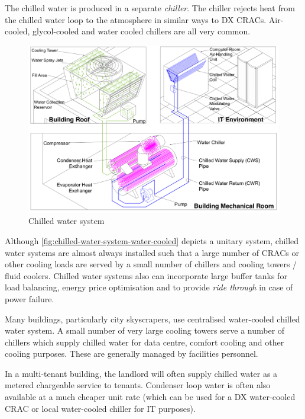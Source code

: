 \documentclass{pgnotes}
\begin{document}

The chilled water is produced in a separate \textit{chiller}.
The chiller rejects heat from the chilled water loop to the atmosphere in similar ways to DX CRACs.
Air-cooled, glycol-cooled and water cooled chillers are all very common.

\begin{figure}[htbp]
  \centering
  \includegraphics[width=1.0\linewidth]{chilled_water_system_water_cooled}
  \caption{Chilled water system}
  \label{fig:chilled-water-system-water-cooled}
\end{figure}

Although \autoref{fig:chilled-water-system-water-cooled} depicts a unitary system, chilled water systems are almost always installed such that a large number of CRACs or other cooling loads are served by a small number of chillers and cooling towers / fluid coolers.
Chilled water systems also can incorporate large buffer tanks for load balancing, energy price optimisation and to provide \textit{ride through} in case of power failure.

Many buildings, particularly city skyscrapers, use centralised water-cooled chilled water system. 
A small number of very large cooling towers serve a number of chillers which supply chilled water for data centre, comfort cooling and other cooling purposes.
These are generally managed by facilities personnel. 

In a multi-tenant building, the landlord will often supply chilled water as a metered chargeable service to tenants.
Condenser loop water is often also available at a much cheaper unit rate (which can be used for a DX water-cooled CRAC or local water-cooled chiller for IT purposes).
\end{document}
